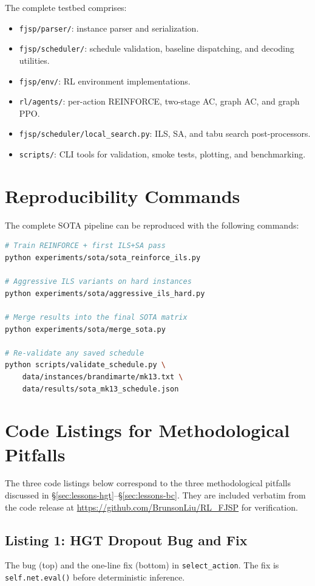 \documentclass[10pt]{article}
\theoremstyle{definition}
\begin{document}
The complete testbed comprises:
\begin{itemize}
  \item \texttt{fjsp/parser/}: instance parser and serialization.
  \item \texttt{fjsp/scheduler/}: schedule validation, baseline
        dispatching, and decoding utilities.
  \item \texttt{fjsp/env/}: RL environment implementations.
  \item \texttt{rl/agents/}: per-action REINFORCE, two-stage AC,
        graph AC, and graph PPO.
  \item \texttt{fjsp/scheduler/local\_search.py}: ILS, SA, and
        tabu search post-processors.
  \item \texttt{scripts/}: CLI tools for validation, smoke tests,
        plotting, and benchmarking.
\end{itemize}

\section{Reproducibility Commands}
\label{app:repro}

The complete SOTA pipeline can be reproduced with the following
commands:
\begin{lstlisting}[language=bash, basicstyle=\ttfamily\footnotesize]
# Train REINFORCE + first ILS+SA pass
python experiments/sota/sota_reinforce_ils.py

# Aggressive ILS variants on hard instances
python experiments/sota/aggressive_ils_hard.py

# Merge results into the final SOTA matrix
python experiments/sota/merge_sota.py

# Re-validate any saved schedule
python scripts/validate_schedule.py \
    data/instances/brandimarte/mk13.txt \
    data/results/sota_mk13_schedule.json
\end{lstlisting}

\section{Code Listings for Methodological Pitfalls}
\label{app:code}

The three code listings below correspond to the three
methodological pitfalls discussed in
\S\ref{sec:lessons-hgt}--\S\ref{sec:lessons-bc}. They
are included verbatim from the code release at
\url{https://github.com/BrunsonLiu/RL_FJSP} for
verification.

\subsection*{Listing 1: HGT Dropout Bug and Fix}
The bug (top) and the one-line fix (bottom) in
\texttt{select\_action}. The fix is
\texttt{self.net.eval()} before deterministic
inference.
\end{document}

